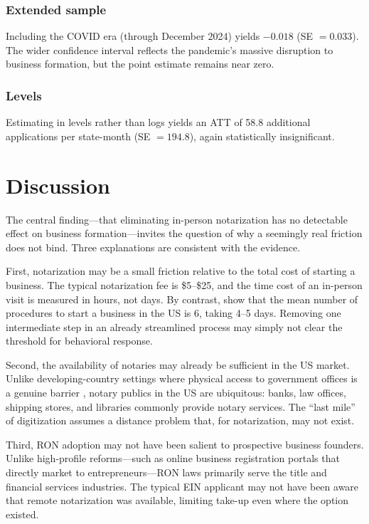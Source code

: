 \documentclass[12pt]{article}
\begin{document}
\subsubsection*{Extended sample} Including the COVID era (through December 2024) yields $-0.018$ (SE $= 0.033$). The wider confidence interval reflects the pandemic's massive disruption to business formation, but the point estimate remains near zero.

\subsubsection*{Levels} Estimating in levels rather than logs yields an ATT of 58.8 additional applications per state-month (SE $= 194.8$), again statistically insignificant.


\section{Discussion}

The central finding---that eliminating in-person notarization has no detectable effect on business formation---invites the question of why a seemingly real friction does not bind. Three explanations are consistent with the evidence.

First, notarization may be a small friction relative to the total cost of starting a business. The typical notarization fee is \$5--\$25, and the time cost of an in-person visit is measured in hours, not days. By contrast, \citet{djankov2002regulation} show that the mean number of procedures to start a business in the US is 6, taking 4--5 days. Removing one intermediate step in an already streamlined process may simply not clear the threshold for behavioral response.

Second, the availability of notaries may already be sufficient in the US market. Unlike developing-country settings where physical access to government offices is a genuine barrier \citep{bruhn2011}, notary publics in the US are ubiquitous: banks, law offices, shipping stores, and libraries commonly provide notary services. The ``last mile'' of digitization assumes a distance problem that, for notarization, may not exist.

Third, RON adoption may not have been salient to prospective business founders. Unlike high-profile reforms---such as online business registration portals that directly market to entrepreneurs---RON laws primarily serve the title and financial services industries. The typical EIN applicant may not have been aware that remote notarization was available, limiting take-up even where the option existed.
\end{document}
